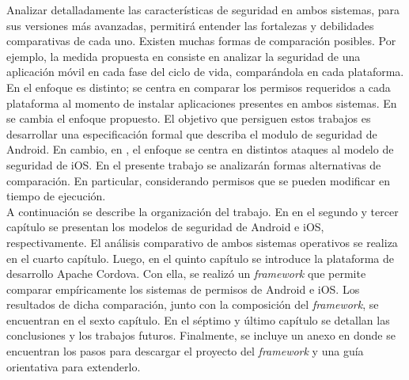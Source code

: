 Analizar detalladamente las características de seguridad en ambos sistemas, para sus versiones más avanzadas, permitirá entender las fortalezas y debilidades comparativas de cada uno. Existen muchas formas de comparación posibles. Por ejemplo, la medida propuesta en \cite{YA2014} consiste en analizar la seguridad de una aplicación móvil en cada fase del ciclo de vida, comparándola en cada plataforma. En \cite{HYGZD2014} el enfoque es distinto; se centra en comparar los permisos requeridos a cada plataforma al momento de instalar aplicaciones presentes en ambos sistemas. En \cite{Gor16, BCLR15, Rom14} se cambia el enfoque propuesto. El objetivo que persiguen estos trabajos es desarrollar una especificación formal que describa el modulo de seguridad de Android. En cambio, en \cite{TZSH13}, el enfoque se centra en distintos ataques al modelo de seguridad de iOS. En el presente trabajo se analizarán formas alternativas de comparación. En particular, considerando permisos que se pueden modificar en tiempo de ejecución.\\

A continuación se describe la organización del trabajo. En en el segundo y tercer capítulo se presentan los modelos de seguridad de Android e iOS, respectivamente. El análisis comparativo de ambos sistemas operativos se realiza en el cuarto capítulo. Luego, en el quinto capítulo se introduce la plataforma de desarrollo Apache Cordova. Con ella, se realizó un \emph{framework} que permite comparar empíricamente los sistemas de permisos de Android e iOS. Los resultados de dicha comparación, junto con la composición del \emph{framework}, se encuentran en el sexto capítulo. En el séptimo y último capítulo se detallan las conclusiones y los trabajos futuros. Finalmente, se incluye un anexo en donde se encuentran los pasos para descargar el proyecto del \emph{framework} y una guía orientativa para extenderlo.